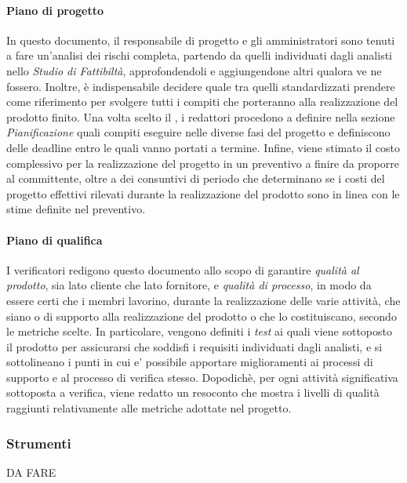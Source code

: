 		\paragraph{Piano di progetto}
			In questo documento, il responsabile di progetto e gli amministratori sono tenuti a fare un'analisi dei rischi completa, partendo da quelli individuati dagli analisti nello \textit{Studio di Fattibiltà}, approfondendoli e aggiungendone altri qualora ve ne fossero. Inoltre, è indispensabile decidere quale  tra quelli standardizzati prendere come riferimento per svolgere tutti i compiti che porteranno alla realizzazione del prodotto finito. Una volta scelto il , i redattori procedono a definire nella sezione \textit{Pianificazione} quali compiti eseguire nelle diverse fasi del progetto e definiscono delle deadline entro le quali vanno portati a termine. Infine, viene stimato il costo complessivo per la realizzazione del progetto in un preventivo a finire da proporre al committente, oltre a dei consuntivi di periodo che determinano se i costi del progetto effettivi rilevati durante la realizzazione del prodotto sono in linea con le stime definite nel preventivo.
		\paragraph{Piano di qualifica}
 			I verificatori redigono questo documento allo scopo di garantire \textit{qualità al prodotto}, sia lato cliente che lato fornitore, e \textit{qualità di processo}, in modo da essere certi che i membri lavorino, durante la realizzazione delle varie attività, che siano o di supporto alla realizzazione del prodotto o che lo costituiscano, secondo le metriche scelte. In particolare, vengono definiti i \textit{test} ai quali viene sottoposto il prodotto per assicurarsi che soddisfi i requisiti individuati dagli analisti, e si sottolineano i punti in cui e' possibile apportare miglioramenti ai processi di supporto e al processo di verifica stesso. Dopodichè, per ogni attività significativa sottoposta a verifica, viene redatto un resoconto che mostra i livelli di qualità raggiunti relativamente alle metriche adottate nel progetto.
	\subsubsection{Strumenti}
	DA FARE